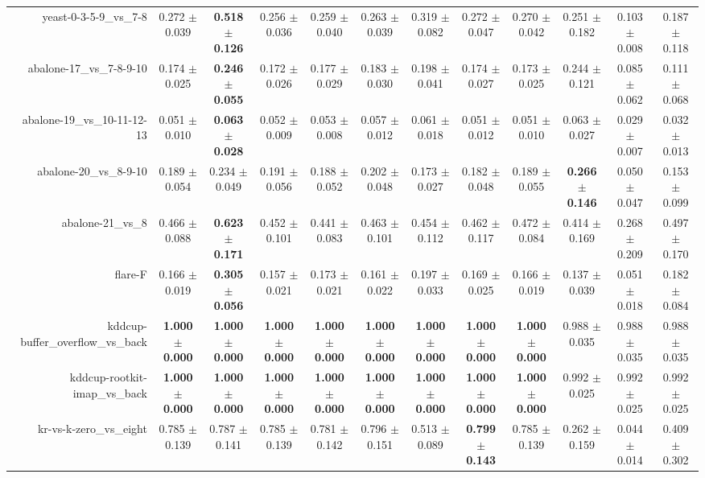 \begin{table}[!ht]
{\begin{tabular}{r c c c c c c c c c c c}
yeast-0-3-5-9\_vs\_7-8 & 0.272 $\pm$ 0.039 & \textbf{0.518 $\pm$ 0.126} & 0.256 $\pm$ 0.036 & 0.259 $\pm$ 0.040 & 0.263 $\pm$ 0.039 & 0.319 $\pm$ 0.082 & 0.272 $\pm$ 0.047 & 0.270 $\pm$ 0.042 & 0.251 $\pm$ 0.182 & 0.103 $\pm$ 0.008 & 0.187 $\pm$ 0.118 \\
abalone-17\_vs\_7-8-9-10 & 0.174 $\pm$ 0.025 & \textbf{0.246 $\pm$ 0.055} & 0.172 $\pm$ 0.026 & 0.177 $\pm$ 0.029 & 0.183 $\pm$ 0.030 & 0.198 $\pm$ 0.041 & 0.174 $\pm$ 0.027 & 0.173 $\pm$ 0.025 & 0.244 $\pm$ 0.121 & 0.085 $\pm$ 0.062 & 0.111 $\pm$ 0.068 \\
abalone-19\_vs\_10-11-12-13 & 0.051 $\pm$ 0.010 & \textbf{0.063 $\pm$ 0.028} & 0.052 $\pm$ 0.009 & 0.053 $\pm$ 0.008 & 0.057 $\pm$ 0.012 & 0.061 $\pm$ 0.018 & 0.051 $\pm$ 0.012 & 0.051 $\pm$ 0.010 & 0.063 $\pm$ 0.027 & 0.029 $\pm$ 0.007 & 0.032 $\pm$ 0.013 \\
abalone-20\_vs\_8-9-10 & 0.189 $\pm$ 0.054 & 0.234 $\pm$ 0.049 & 0.191 $\pm$ 0.056 & 0.188 $\pm$ 0.052 & 0.202 $\pm$ 0.048 & 0.173 $\pm$ 0.027 & 0.182 $\pm$ 0.048 & 0.189 $\pm$ 0.055 & \textbf{0.266 $\pm$ 0.146} & 0.050 $\pm$ 0.047 & 0.153 $\pm$ 0.099 \\
abalone-21\_vs\_8 & 0.466 $\pm$ 0.088 & \textbf{0.623 $\pm$ 0.171} & 0.452 $\pm$ 0.101 & 0.441 $\pm$ 0.083 & 0.463 $\pm$ 0.101 & 0.454 $\pm$ 0.112 & 0.462 $\pm$ 0.117 & 0.472 $\pm$ 0.084 & 0.414 $\pm$ 0.169 & 0.268 $\pm$ 0.209 & 0.497 $\pm$ 0.170 \\
flare-F & 0.166 $\pm$ 0.019 & \textbf{0.305 $\pm$ 0.056} & 0.157 $\pm$ 0.021 & 0.173 $\pm$ 0.021 & 0.161 $\pm$ 0.022 & 0.197 $\pm$ 0.033 & 0.169 $\pm$ 0.025 & 0.166 $\pm$ 0.019 & 0.137 $\pm$ 0.039 & 0.051 $\pm$ 0.018 & 0.182 $\pm$ 0.084 \\
kddcup-buffer\_overflow\_vs\_back & \textbf{1.000 $\pm$ 0.000} & \textbf{1.000 $\pm$ 0.000} & \textbf{1.000 $\pm$ 0.000} & \textbf{1.000 $\pm$ 0.000} & \textbf{1.000 $\pm$ 0.000} & \textbf{1.000 $\pm$ 0.000} & \textbf{1.000 $\pm$ 0.000} & \textbf{1.000 $\pm$ 0.000} & 0.988 $\pm$ 0.035 & 0.988 $\pm$ 0.035 & 0.988 $\pm$ 0.035 \\
kddcup-rootkit-imap\_vs\_back & \textbf{1.000 $\pm$ 0.000} & \textbf{1.000 $\pm$ 0.000} & \textbf{1.000 $\pm$ 0.000} & \textbf{1.000 $\pm$ 0.000} & \textbf{1.000 $\pm$ 0.000} & \textbf{1.000 $\pm$ 0.000} & \textbf{1.000 $\pm$ 0.000} & \textbf{1.000 $\pm$ 0.000} & 0.992 $\pm$ 0.025 & 0.992 $\pm$ 0.025 & 0.992 $\pm$ 0.025 \\
kr-vs-k-zero\_vs\_eight & 0.785 $\pm$ 0.139 & 0.787 $\pm$ 0.141 & 0.785 $\pm$ 0.139 & 0.781 $\pm$ 0.142 & 0.796 $\pm$ 0.151 & 0.513 $\pm$ 0.089 & \textbf{0.799 $\pm$ 0.143} & 0.785 $\pm$ 0.139 & 0.262 $\pm$ 0.159 & 0.044 $\pm$ 0.014 & 0.409 $\pm$ 0.302 \\

\end{tabular}}
\end{table}
